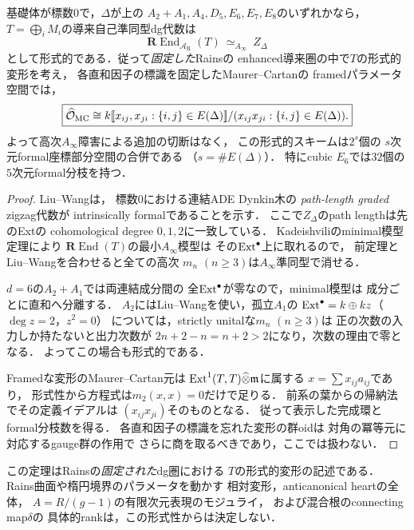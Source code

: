 \begin{theorem}[根配置のdg形式性と形式変形の二次完全性]
\label{thm:zigzag-formal}
基礎体が標数$0$で，$\Delta$が上の
$A_2+A_1,A_4,D_5,E_6,E_7,E_8$のいずれかなら，
$T=\bigoplus_i M_i$の導来自己準同型dg代数は
\[
\boxed{\mathbf R\operatorname{End}_{\mathcal A_{\mathrm R}}(T)
 \ \simeq_{A_\infty}\ Z_\Delta}
\]
として形式的である．従って\emph{固定した}Rainsの
enhanced導来圏の中で$T$の形式的変形を考え，
各直和因子の標識を固定したMaurer--Cartanの
framedパラメータ空間では，
\[
\boxed{
 \widehat{\mathcal O}_{\rm MC}
 \cong
 k[\![x_{ij},x_{ji}:\{i,j\}\in E(\Delta)]\!]/
      (x_{ij}x_{ji}:\{i,j\}\in E(\Delta)).
}
\]
よって高次$A_\infty$障害による追加の切断はなく，
この形式的スキームは$2^{s}$個の
$s$次元formal座標部分空間の合併である
（$s=\#E(\Delta)$）．
特にcubic $E_6$では$32$個の$5$次元formal分枝を持つ．
\end{theorem}
\begin{proof}
Liu--Wang\cite[Theorem~1.1]{LiuWangZigzag}は，
標数$0$における連結ADE Dynkin木の
\emph{path-length graded} zigzag代数が
intrinsically formalであることを示す．
ここで$Z_\Delta$のpath lengthは先のExtの
cohomological degree $0,1,2$に一致している．
Kadeishviliのminimal模型定理により
$\mathbf R\operatorname{End}(T)$の最小$A_\infty$模型は
その$\operatorname{Ext}^\bullet$上に取れるので，
前定理とLiu--Wangを合わせると全ての高次
$m_n$ $(n\ge3)$は$A_\infty$準同型で消せる．

$d=6$の$A_2+A_1$では両連結成分間の
全$\operatorname{Ext}^\bullet$が零なので，minimal模型は
成分ごとに直和へ分離する．
$A_2$にはLiu--Wangを使い，孤立$A_1$の
$\operatorname{Ext}^\bullet=k\oplus kz$（$\deg z=2$，$z^2=0$）
については，strictly unitalな$m_n$ $(n\ge3)$は
正の次数の入力しか持たないと出力次数が
$2n+2-n=n+2>2$になり，次数の理由で零となる．
よってこの場合も形式的である．

Framedな変形のMaurer--Cartan元は
$\operatorname{Ext}^1(T,T)\widehat\otimes\mathfrak m$に属する
$x=\sum x_{ij}a_{ij}$であり，
形式性から方程式は$m_2(x,x)=0$だけで足りる．
前系の葉からの帰納法でその定義イデアルは
$(x_{ij}x_{ji})$そのものとなる．
従って表示した完成環とformal分枝数を得る．
各直和因子の標識を忘れた変形の群oidは
対角の冪等元に対応するgauge群の作用で
さらに商を取るべきであり，ここでは扱わない．
\end{proof}
\begin{remark}[形式性が与えないもの]
この定理はRainsの\emph{固定された}dg圏における
$T$の形式的変形の記述である．
Rains曲面や楕円境界のパラメータを動かす
相対変形，anticanonical heartの全体，
$A=R/(g-1)$の有限次元表現のモジュライ，
および混合根のconnecting map$\delta$の
具体的rankは，この形式性からは決定しない．
\end{remark}


